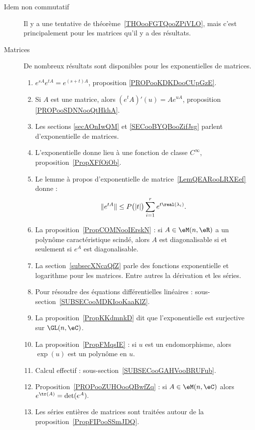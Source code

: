 \begin{description}
    \item[Idem non commutatif]

        Il y a une tentative de théorème~\ref{THOooFGTQooZPiVLO}, mais c'est principalement pour les matrices qu'il y a des résultats.

    \item[Matrices]

        De nombreux résultats sont disponibles pour les exponentielles de matrices.

\begin{enumerate}
    \item
        \( e^{sA} e^{tA}= e^{(s+t)A}\), proposition \ref{PROPooKDKDooCUpGzE}.
    \item
        Si \( A\) est une matrice, alors \( (e^tA)'(u)=Ae^{uA}\), proposition \ref{PROPooSDNNooQtHkhA}.
    \item
        Les sections \ref{secAOnIwQM} et \ref{SECooBYQBooZifJsg} parlent d'exponentielle de matrices.
    \item
        L'exponentielle donne lieu à une fonction de classe \(  C^{\infty}\), proposition~\ref{PropXFfOiOb}.
    \item
            Le lemme à propos d'exponentielle de matrice~\ref{LemQEARooLRXEef} donne :
            \begin{equation*}
                \|  e^{tA} \|\leq P\big( | t | \big)\sum_{i=1}^r e^{t\real(\lambda_i)}.
            \end{equation*}
        \item
            La proposition~\ref{PropCOMNooIErskN} : si \( A\in \eM(n,\eR)\) a un polynôme caractéristique scindé, alors \( A\) est diagonalisable si et seulement si \( e^A\) est diagonalisable.
\item
    La section~\ref{subsecXNcaQfZ} parle des fonctions exponentielle et logarithme pour les matrices. Entre autres la dérivation et les séries.
\item
    Pour résoudre des équations différentielles linéaires : sous-section~\ref{SUBSECooMDKIooKaaKlZ}.
\item
    La proposition~\ref{PropKKdmnkD} dit que l'exponentielle est surjective sur \( \GL(n,\eC)\).
\item

La proposition~\ref{PropFMqsIE} : si \( u\) est un endomorphisme, alors \( \exp(u)\) est un polynôme en \( u\).
\item
    Calcul effectif : sous-section~\ref{SUBSECooGAHVooBRUFub}.
\item Proposition~\ref{PROPooZUHOooQBwfZq} : si \( A\in\eM(n,\eC)\) alors $ e^{\tr(A)}=\det( e^{A}).$
    \item
        Les séries entières de matrices sont traitées autour de la proposition~\ref{PropFIPooSSmJDQ}.
\end{enumerate}


\end{description}

